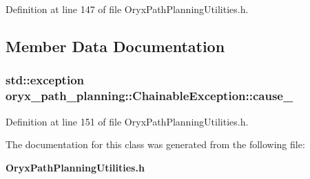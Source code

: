 \-Definition at line 147 of file \-Oryx\-Path\-Planning\-Utilities.\-h.



\subsection{\-Member \-Data \-Documentation}
\subsubsection[{cause\-\_\-}]{\setlength{\rightskip}{0pt plus 5cm}std\-::exception {\bf oryx\-\_\-path\-\_\-planning\-::\-Chainable\-Exception\-::cause\-\_\-}\hspace{0.3cm}{\ttfamily  [protected]}}\label{classoryx__path__planning_1_1ChainableException_a5c1bd8bc4bd38a5bc66b2c29fd48fda9}


\-Definition at line 151 of file \-Oryx\-Path\-Planning\-Utilities.\-h.



\-The documentation for this class was generated from the following file\-:\begin{DoxyCompactItemize}
\item 
{\bf \-Oryx\-Path\-Planning\-Utilities.\-h}\end{DoxyCompactItemize}
